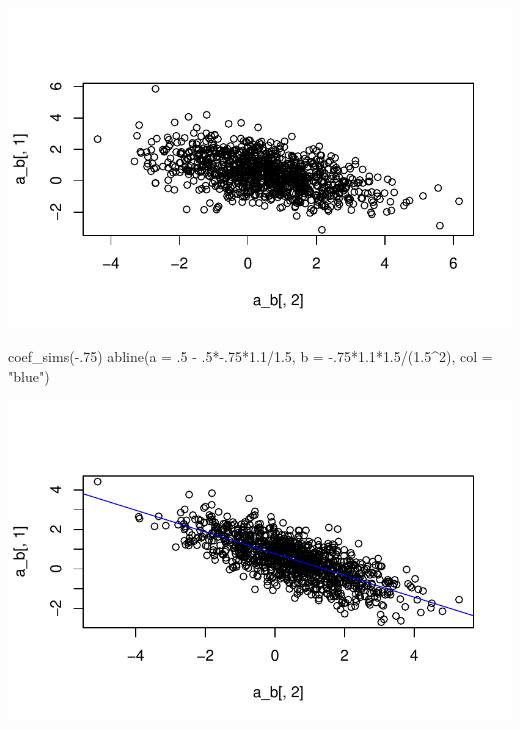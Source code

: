 \documentclass[
  letterpaper,
  DIV=11,
  numbers=noendperiod]{scrartcl}
\newenvironment{Shaded}{\begin{snugshade}}{\end{snugshade}}
\newcommand{\AttributeTok}[1]{\textcolor[rgb]{0.40,0.45,0.13}{#1}}
\newcommand{\DecValTok}[1]{\textcolor[rgb]{0.68,0.00,0.00}{#1}}
\newcommand{\FloatTok}[1]{\textcolor[rgb]{0.68,0.00,0.00}{#1}}
\newcommand{\FunctionTok}[1]{\textcolor[rgb]{0.28,0.35,0.67}{#1}}
\newcommand{\NormalTok}[1]{\textcolor[rgb]{0.00,0.23,0.31}{#1}}
\newcommand{\SpecialCharTok}[1]{\textcolor[rgb]{0.37,0.37,0.37}{#1}}
\newcommand{\StringTok}[1]{\textcolor[rgb]{0.13,0.47,0.30}{#1}}
\begin{document}
\includegraphics{varying_intercepts_varying_slopes_files/figure-pdf/unnamed-chunk-3-4.pdf}

\begin{Shaded}
\begin{Highlighting}[]
\FunctionTok{coef\_sims}\NormalTok{(}\SpecialCharTok{{-}}\NormalTok{.}\DecValTok{75}\NormalTok{)}
\FunctionTok{abline}\NormalTok{(}\AttributeTok{a =}\NormalTok{ .}\DecValTok{5} \SpecialCharTok{{-}}\NormalTok{ .}\DecValTok{5}\SpecialCharTok{*{-}}\NormalTok{.}\DecValTok{75}\SpecialCharTok{*}\FloatTok{1.1}\SpecialCharTok{/}\FloatTok{1.5}\NormalTok{, }\AttributeTok{b =} \SpecialCharTok{{-}}\NormalTok{.}\DecValTok{75}\SpecialCharTok{*}\FloatTok{1.1}\SpecialCharTok{*}\FloatTok{1.5}\SpecialCharTok{/}\NormalTok{(}\FloatTok{1.5}\SpecialCharTok{\^{}}\DecValTok{2}\NormalTok{), }\AttributeTok{col =} \StringTok{"blue"}\NormalTok{)}
\end{Highlighting}
\end{Shaded}

\includegraphics{varying_intercepts_varying_slopes_files/figure-pdf/unnamed-chunk-3-5.pdf}
\end{document}
